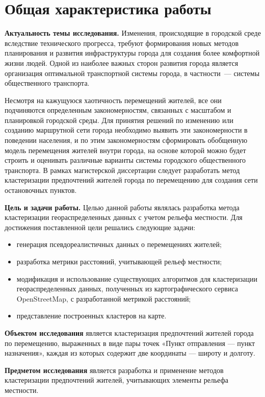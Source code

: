 \section{Общая характеристика работы}
\textbf{Актуальность темы исследования.} Изменения, происходящие в городской среде вследствие технического прогресса, требуют формирования новых методов планирования и развития инфраструктуры города для создания более комфортной жизни людей. Одной из наиболее важных сторон развития города является организация оптимальной транспортной системы города, в частности~--- системы общественного транспорта.

Несмотря на кажущуюся хаотичность перемещений жителей, все они подчиняются определенным закономерностям, связанных с масштабом и планировкой городской среды. Для принятия решений по изменению или созданию маршрутной сети города необходимо выявить эти закономерности в поведении населения, и по этим закономерностям сформировать обобщенную модель перемещения жителей внутри города, на основе которой можно будет строить и оценивать различные варианты системы городского общественного транспорта. В рамках магистерской диссертации следует разработать метод кластеризации предпочтений жителей города по перемещению для создания сети остановочных пунктов.

\textbf{Цель и задачи работы.} Целью данной работы являлась разработка метода кластеризации геораспределенных данных с учетом рельефа местности. Для достижения 
поставленной цели решались следующие задачи:
\begin{itemize}
    \item генерация псевдореалистичных данных о перемещениях жителей;
    \item разработка метрики расстояний, учитывающей рельеф местности;
    \item модификация и использование существующих алгоритмов для кластеризации геораспределенных данных, полученных из картографического сервиса OpenStreetMap, с разработанной метрикой расстояний;
    \item представление построенных кластеров на карте.
\end{itemize}

\textbf{Объектом исследования} является кластеризация предпочтений жителей города по перемещению, выраженных в виде пары точек «Пункт отправления — пункт назначения», каждая из которых содержит две координаты — широту и долготу.

\textbf{Предметом исследования} является разработка и применение методов кластеризации предпочтений жителей, учитывающих элементы рельефа местности.

